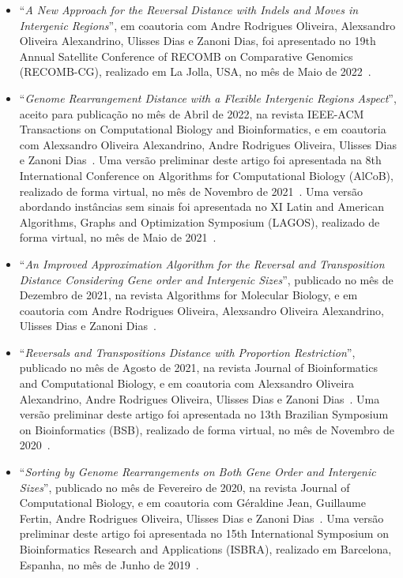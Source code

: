 \begin{itemize}
  \item ``\textit{A New Approach for the Reversal Distance with Indels and Moves in Intergenic Regions}'', em coautoria com Andre Rodrigues Oliveira, Alexsandro Oliveira Alexandrino, Ulisses Dias e Zanoni Dias, foi apresentado no 19th Annual Satellite Conference of RECOMB on Comparative Genomics (RECOMB-CG), realizado em La Jolla, USA, no mês de Maio de 2022~\cite{2022b-brito-etal}.

  \item ``\textit{Genome Rearrangement Distance with a Flexible Intergenic Regions Aspect}'', aceito para publicação no mês de Abril de 2022, na revista IEEE-ACM Transactions on Computational Biology and Bioinformatics, e em coautoria com Alexsandro Oliveira Alexandrino, Andre Rodrigues Oliveira, Ulisses Dias e Zanoni Dias~\cite{2022a-brito-etal}. Uma versão preliminar deste artigo foi apresentada na 8th International Conference on Algorithms for Computational Biology (AlCoB), realizado de forma virtual, no mês de Novembro de 2021~\cite{2021c-brito-etal}. Uma versão abordando instâncias sem sinais foi apresentada no XI Latin and American Algorithms, Graphs and Optimization Symposium (LAGOS), realizado de forma virtual, no mês de Maio de 2021~\cite{2021d-brito-etal}.

  \item ``\textit{An Improved Approximation Algorithm for the Reversal and Transposition Distance Considering Gene order and Intergenic Sizes}'', publicado no mês de Dezembro de 2021, na revista Algorithms for Molecular Biology, e em coautoria com Andre Rodrigues Oliveira, Alexsandro Oliveira Alexandrino, Ulisses Dias e Zanoni Dias~\cite{2021b-brito-etal}.

  \item ``\textit{Reversals and Transpositions Distance with Proportion Restriction}'', publicado no mês de Agosto de 2021, na revista Journal of Bioinformatics and Computational Biology, e em coautoria com Alexsandro Oliveira Alexandrino, Andre Rodrigues Oliveira, Ulisses Dias e Zanoni Dias~\cite{2021a-brito-etal}. Uma versão preliminar deste artigo foi apresentada no 13th Brazilian Symposium on Bioinformatics (BSB), realizado de forma virtual, no mês de Novembro de 2020~\cite{2020c-brito-etal}.

  \item ``\textit{Sorting by Genome Rearrangements on Both Gene Order and Intergenic Sizes}'', publicado no mês de Fevereiro de 2020, na revista Journal of Computational Biology, e em coautoria com Géraldine Jean, Guillaume Fertin, Andre Rodrigues Oliveira, Ulisses Dias e Zanoni Dias~\cite{2020a-brito-etal}. Uma versão preliminar deste artigo foi apresentada no 15th International Symposium on Bioinformatics Research and Applications (ISBRA), realizado em Barcelona, Espanha, no mês de Junho de 2019~\cite{2019-brito-etal}.
\end{itemize}

